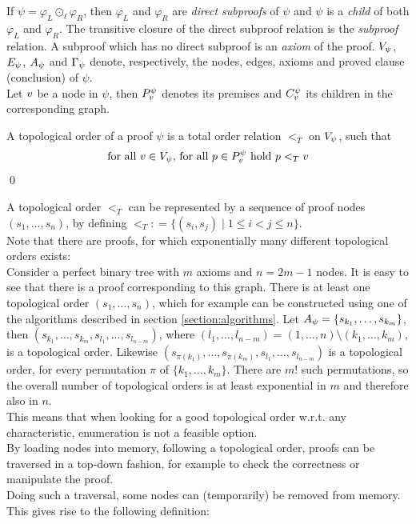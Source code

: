 \documentclass{llncs}
\newcommand{\defeq}{\mathrel{\mathop:}=}
\begin{document}
\noindent
If $\psi = \varphi_L \odot_{\ell} \varphi_R$, then $\varphi_L$ and $\varphi_R$ are \emph{direct
subproofs} of $\psi$ and $\psi$ is a \emph{child} of both $\varphi_L$ and $\varphi_R$. The
transitive closure of the direct subproof relation is the \emph{subproof} relation. A subproof which
has no direct subproof is an \emph{axiom} of the proof. 
%
$V_{\psi}$, $E_{\psi}$, $A_{\psi}$ and $\Gamma_{\psi}$
denote, respectively, the nodes, edges, axioms and proved clause (conclusion) of $\psi$.\\
Let $v$ be a node in $\psi$, then $P_{v}^{\psi}$ denotes its premises and $C_{v}^{\psi}$ its children in the corresponding graph.

\begin{definition}
\label{def:topological-order}
A topological order of a proof $\psi$ is a total order relation $<_T$ on $V_{\psi}$, such that 
$$
\text{for all } v \in V_{\psi} \text{, for all } p \in P_{v}^{\psi} \text{ hold }\\
p <_T v
$$
\qed
\end{definition}
A topological order $<_T$ can be represented by a sequence of proof nodes $(s_1,\dots,s_n)$, by defining $<_T \defeq \{(s_i,s_j) \mid 1 \leq i < j \leq n\}$.\\
Note that there are proofs, for which exponentially many different topological orders exists:\\
Consider a perfect binary tree with $m$ axioms and $n=2m-1$ nodes. It is easy to see that there is a proof corresponding to this graph.
There is at least one topological order $(s_1,\ldots,s_n)$, which for example can be constructed using one of the algorithms described in section \ref{section:algorithms}. 
Let $A_{\psi} = \{s_{k_1},\ldots,s_{k_m}\}$, then $(s_{k_1},\ldots,s_{k_m},s_{l_1},\ldots,s_{l_{n-m}})$, where $(l_1,\ldots,l_{n-m}) = (1,\ldots,n) \setminus (k_1,\ldots,k_m)$, is a topological order. 
Likewise $(s_{\pi({k_1})},\ldots,s_{\pi({k_m})},s_{l_1},\ldots,s_{l_{n-m}})$ is a topological order, for every permutation $\pi$ of $\{k_1,\ldots,k_m\}$. There are $m!$ such permutations, so the overall number of topological orders is at least exponential in $m$ and therefore also in $n$.\\
This means that when looking for a good topological order w.r.t. any characteristic, enumeration is not a feasible option.\\

\noindent 
By loading nodes into memory, following a topological order, proofs can be traversed in a top-down fashion, for example to check the correctness or manipulate the proof.\\
Doing such a traversal, some nodes can (temporarily) be removed from memory. This gives rise to the following definition:
\end{document}
